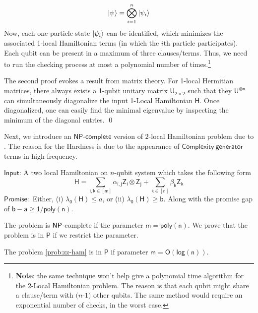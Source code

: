 \documentclass[11pt]{article}
\begin{document}
\begin{equation}
    \ket{\psi}= \bigotimes_{i=1}^n \ket{\psi_i}
\end{equation}
Now, each one-particle state $\ket{\psi_i}$ can be identified, which minimizes the associated 1-local Hamiltonian terms (in which the $i$th particle participates). Each qubit can be present in a maximum of three clauses/terms. Thus, we need to run the checking process at most a polynomial number of times.\footnote{\textbf{Note}: the same technique won't help give a polynomial time algorithm for the 2-Local Hamiltonian problem. The reason is that each qubit might share a clause/term with $(n$-$1)$ other qubits. The same method would require an exponential number of checks, in the worst case.}    \par
The second proof evokes a result from matrix theory. For 1-local Hermitian matrices, there always exists a 1-qubit unitary matrix  $ \mathsf{U_{2\times 2}}$ such that they $\mathsf{U^{\otimes n}}$ can simultaneously diagonalize the input 1-Local Hamiltonian $\mathsf{H}$. Once diagonalized, one can easily find the minimal eigenvalue by inspecting the minimum of the diagonal entries. \qed 

Next, we introduce an $\mathsf{NP}$-$\mathsf{complete}$ version of $2$-local Hamiltonian problem due to \cite{Bar82}. The reason for the Hardness is due to the appearance of $\mathsf{Complexity\ generator}$ terms in high frequency. 
\begin{prob}
     $\mathsf{Input}$: A two local Hamiltonian on $n$-qubit system which takes the following form 
    \begin{equation}
        \mathsf{H=\sum_{i,k\in [m]}\alpha_{i,j}Z_i \otimes Z_j + \sum_{k\in [n]}\beta_k Z_k} 
    \end{equation}
    $\mathsf{Promise}:$ Either, (i) $\mathsf{\lambda_0(H)}\leq a$, or (ii) $\mathsf{\lambda_0(H)\geq b}$. Along with the promise gap of $\mathsf{b-a \geq 1/poly(n)}$.
    \label{prob:zz-ham}
\end{prob}

The problem is $\mathsf{NP}$-complete if the parameter $\mathsf{m=poly(n)}$. We prove that the problem is in $\mathsf{P}$ if we restrict the parameter.

\begin{theorem}
The problem \ref{prob:zz-ham} is in $\mathsf{P}$ if parameter $\mathsf{m=O(log(n))}$. \label{thm:zz-ham}
\end{theorem}
\end{document}
